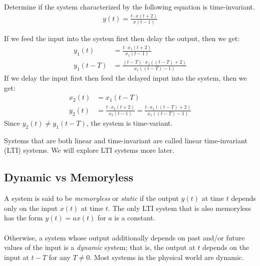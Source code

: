 \documentclass{report}
\begin{document}
\begin{example}
    Determine if the system characterized by the following equation is time-invariant.
    \begin{align*}
        y(t) = \frac{t\cdot x(t+2)}{x(t-1)}
    \end{align*}
\end{example}
\begin{solution}
    If we feed the input into the system first then delay the output, then we get:
    \begin{align*}
        y_1(t) &= \frac{t\cdot x_1(t+2)}{x_1(t-1)} \\
        y_1(t-T) &= \frac{(t-T)\cdot x_1((t-T)+2)}{x_1((t-T)-1)}
    \end{align*}
    If we delay the input first then feed the delayed input into the system, then we get:
    \begin{align*}
        x_2(t) &= x_1(t-T) \\
        y_2(t) &= \frac{t\cdot x_2(t+2)}{x_2(t-1)} = \frac{t\cdot x_1((t-T)+2)}{x_1((t-T)-1)}
    \end{align*}
    Since $y_2(t) \neq y_1(t-T)$, the system is time-variant.
\end{solution}

Systems that are both linear and time-invariant are called linear time-invariant (LTI) systems. We will explore LTI systems more later. 

\subsection{Dynamic vs Memoryless}
A system is said to be \emph{memoryless} or \emph{static} if the output $y(t)$ at time $t$ depends only on the input $x(t)$ at time $t$. The only LTI system 
that is also memoryless has the form $y(t)=ax(t)$ for $a$ is a constant. \\ \\
Otherwise, a system whose output additionally depends on past and/or future values of the input is a \emph{dynamic} system; that is, the output at $t$ 
depends on the input at $t-T$ for any $T\neq 0$. Most systems in the physical world are dynamic.
\end{document}
